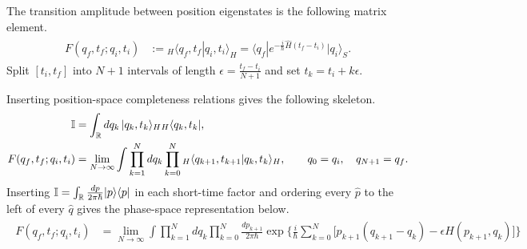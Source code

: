 \documentclass[../QFT_main.tex]{subfiles}
\begin{document}
\begin{mytheorem}
The transition amplitude between position eigenstates is the following matrix element.
{\small\begin{align}\begin{aligned}
    F(q_f,t_f;q_i,t_i) &:= {}_H\langle q_f,t_f|q_i,t_i\rangle_H = \langle q_f|e^{-\tfrac{i}{\hbar}\hat H(t_f-t_i)}|q_i\rangle_S.
\end{aligned}\end{align}}
Split $[t_i,t_f]$ into $N+1$ intervals of length $\epsilon=\tfrac{t_f-t_i}{N+1}$ and set $t_k=t_i+k\epsilon$.
\begin{center}
\end{center}
Inserting position-space completeness relations gives the following skeleton.
{\small\begin{align}\begin{aligned}
    \mathbb{I} &= \int_{\mathbb{R}}dq_k\,|q_k,t_k\rangle_H{}_H\langle q_k,t_k|, \\
    F(q_f,t_f;q_i,t_i) &= \lim_{N\to\infty}\int\prod_{k=1}^{N}dq_k\prod_{k=0}^{N}{}_H\langle q_{k+1},t_{k+1}|q_k,t_k\rangle_H, \qquad q_0=q_i,\quad q_{N+1}=q_f.
\end{aligned}\end{align}}
Inserting $\mathbb{I}=\int_{\mathbb{R}}\tfrac{dp}{2\pi\hbar}|p\rangle\langle p|$ in each short-time factor and ordering every $\hat p$ to the left of every $\hat q$ gives the phase-space representation below.
{\small\begin{align}\begin{aligned}
    F(q_f,t_f;q_i,t_i) &= \lim_{N\to\infty}\int\prod_{k=1}^{N}dq_k\prod_{k=0}^{N}\tfrac{dp_{k+1}}{2\pi\hbar}\exp\Bigg\{\tfrac{i}{\hbar}\sum_{k=0}^{N}\Big[p_{k+1}(q_{k+1}-q_k)-\epsilon H(p_{k+1},q_k)\Big]\Bigg\} \\

\end{aligned}
\end{align}}
\end{mytheorem}
\end{document}
